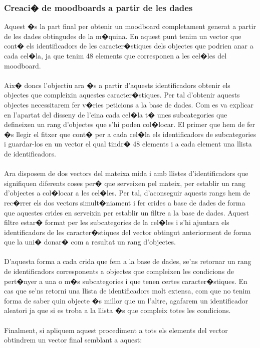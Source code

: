 \documentclass[12pt,a4paper,openright,oneside]{article}
\numberwithin{equation}{section}
\theoremstyle{definition}
\begin{document}
\subsubsection{Creaci� de moodboards a partir de les dades}
Aquest �s la part final per obtenir un moodboard completament generat a partir de les dades obtingudes de la m�quina. En aquest punt tenim un vector que cont� els identificadors de les caracter�stiques dels objectes que podrien anar a cada cel�la, ja que tenim 48 elements que corresponen a les cel�les del moodboard. \\\\
Aix� doncs l'objectiu ara �s a partir d'aquests identificadors obtenir els objectes que compleixin aquestes caracter�stiques. Per tal d'obtenir aquests objectes necessitarem fer v�ries peticions a la base de dades. Com es va explicar en l'apartat del disseny de l'eina cada cel�la t� unes subcategories que defineixen un rang d'objectes que s'hi poden col�locar. El primer que hem de fer �s llegir el fitxer que cont� per a cada cel�la els identificadors de subcategories i guardar-los en un vector el qual tindr� 48 elements i a cada element una llista de identificadors.\\\\
Ara disposem de dos vectors del mateixa mida i amb llistes d'identificadors que signifiquen diferents coses per� que serveixen pel mateix, per establir un rang d'objectes a col�locar a les cel�les. Per tal, d'aconseguir aquests rangs hem de rec�rrer els dos vectors simult�niament i fer crides a base de dades de forma que aquestes crides en serveixin per establir un filtre a la base de dades. Aquest filtre estar� format per les subcategories de la cel�les i s'hi ajuntara els identificadors de les caracter�stiques del vector obtingut anteriorment de forma que la uni� donar� com a resultat un rang d'objectes.\\\\
D'aquesta forma a cada crida que fem a la base de dades, se'ns retornar un rang de identificadors corresponents a objectes que compleixen les condicions de pert�nyer a una o m�s subcategories i que tenen certes caracter�stiques. En cas que se'ns retorni una llista de identificadors molt extensa, com que no tenim forma de saber quin objecte �s millor que un l'altre, agafarem un identificador aleatori ja que si es troba a la llista �s que compleix totes les condicions.\\\\
Finalment, si apliquem aquest procediment a tots els elements del vector obtindrem un vector final semblant a aquest:
\end{document}
